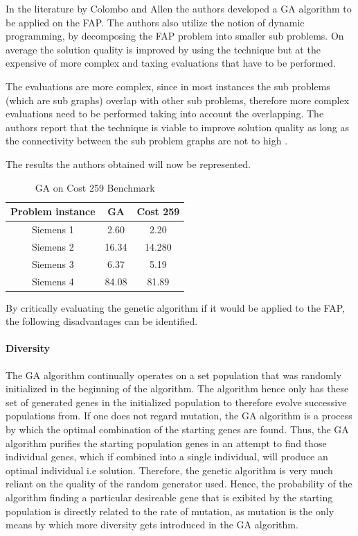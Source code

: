 In the literature by Colombo and Allen\cite{ProblemDecompMIFAP} the authors developed a GA algorithm to be applied on the FAP. The authors also utilize the notion of dynamic programming, by decomposing the FAP problem into smaller sub problems. On average the solution quality is improved by using the technique but at the expensive of more complex and taxing evaluations that have to be performed\cite{ProblemDecompMIFAP}. 

The evaluations are more complex, since in most instances the sub problems (which are sub graphs) overlap with other sub problems, therefore more complex evaluations need to be performed taking into account the overlapping\cite{ProblemDecompMIFAP}. The authors report that the technique is viable to improve solution quality as long as the connectivity between the sub problem graphs are not to high \cite{ProblemDecompMIFAP}.

The results the authors obtained will now be represented.

\begin{table}
\centering
	\begin{tabular}{| c | c | c |}
	\hline
	Problem instance & GA & Cost 259 \\ \hline
	Siemens 1 & 2.60 & 2.20 \\ \hline
	Siemens 2 & 16.34 & 14.280 \\ \hline
	Siemens 3 & 6.37 & 5.19 \\ \hline
	Siemens 4 & 84.08 & 81.89 \\ \hline
	\end{tabular}
\caption{GA on Cost 259 Benchmark}
\end{table}

By critically evaluating the genetic algorithm if it would be applied to the FAP, the following disadvantages can be identified.

\paragraph{Diversity}
The GA algorithm continually operates on a set population that was randomly initialized in the beginning of the algorithm. The algorithm hence only has these set of generated genes in the initialized population to therefore evolve successive populations from.
If one does not regard mutation, the GA algorithm is a process by which the optimal combination of the starting genes are found. Thus, the GA algorithm purifies the starting population genes in an attempt to find those individual genes, which if combined into a single individual, will produce an optimal individual i.e solution. Therefore, the genetic algorithm is very much reliant on the quality of the random generator used. Hence, the probability of the algorithm finding a particular desireable gene that is exibited by the starting population is directly related to the rate of mutation, as mutation is the only means by which more diversity gets introduced in the GA algorithm.
